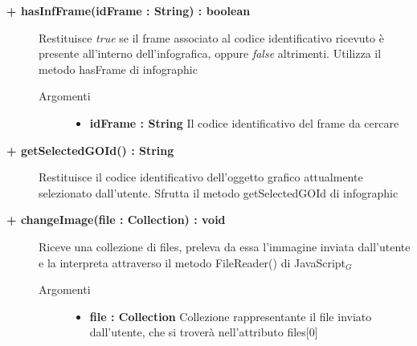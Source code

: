 \begin{description}
\begin{description}
	\end{description}
	
	\begin{description}
		\item[\textbf{\color{blue} + hasInfFrame(idFrame : String) : boolean		}] \hfill
			Restituisce \textit{true} se il frame associato al codice identificativo ricevuto è presente all'interno dell'infografica, oppure \textit{false} altrimenti. Utilizza il metodo hasFrame di infographic
			
		\begin{description}
			\item[Argomenti] \hfill
				\begin{itemize}
				
					\item \textbf{idFrame : String		} \hfill
					Il codice identificativo del frame da cercare
					
				\end{itemize}
			
		\end{description}
	\end{description}
	
	\begin{description}
		\item[\textbf{\color{blue}+ getSelectedGOId() : String		}] \hfill
			Restituisce il codice identificativo dell'oggetto grafico attualmente selezionato dall'utente. Sfrutta il metodo getSelectedGOId di infographic
			
	\end{description}
	
	\begin{description}
		\item[\textbf{\color{blue}+ changeImage(file : Collection) : void  	}] \hfill
			Riceve una collezione di files, preleva da essa l'immagine inviata dall'utente e la interpreta attraverso il metodo FileReader() di JavaScript$_G$
			
		\begin{description}
			\item[Argomenti] \hfill
				\begin{itemize}
				
					\item \textbf{file : Collection		} \hfill
					Collezione rappresentante il file inviato dall'utente, che si troverà nell'attributo files[0]					
				\end{itemize}
				

\end{description}
\end{description}
\end{description}
